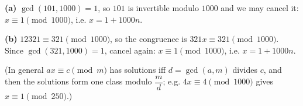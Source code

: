 \textbf{(a)} $\gcd(101,1000)=1$, so $101$ is invertible modulo $1000$ and we may cancel it: $x\equiv1\pmod{1000}$, i.e. $\boxed{x=1+1000n}$.

\textbf{(b)} $12321\equiv321\pmod{1000}$, so the congruence is $321x\equiv321\pmod{1000}$. Since $\gcd(321,1000)=1$, cancel again: $x\equiv1\pmod{1000}$, i.e. $\boxed{x=1+1000n}$.

(In general $ax\equiv c\pmod m$ has solutions iff $d=\gcd(a,m)$ divides $c$, and then the solutions form one class modulo $\dfrac {m}{d}$; e.g. $4x\equiv4\pmod{1000}$ gives $x\equiv1\pmod{250}$.)
